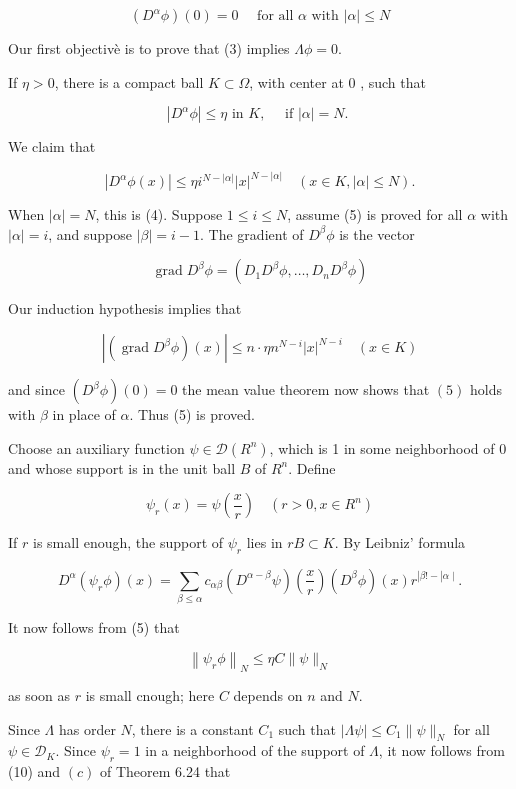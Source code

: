 \documentclass[10pt]{article}
\begin{document}
$$
\left(D^{\alpha} \phi\right)(0)=0 \quad \text { for all } \alpha \text { with }|\alpha| \leq N
$$

Our first objectivè is to prove that (3) implies $\Lambda \phi=0$.

If $\eta>0$, there is a compact ball $K \subset \Omega$, with center at 0 , such that

$$
\left|D^{\alpha} \phi\right| \leq \eta \text { in } K, \quad \text { if }|\alpha|=N \text {. }
$$

We claim that

$$
\left|D^{\alpha} \phi(x)\right| \leq \eta i^{N-|\alpha|}|x|^{N-|\alpha|} \quad(x \in K,|\alpha| \leq N) .
$$

When $|\alpha|=N$, this is (4). Suppose $1 \leq i \leq N$, assume (5) is proved for all $\alpha$ with $|\alpha|=i$, and suppose $|\beta|=i-1$. The gradient of $D^{\beta} \phi$ is the vector

$$
\operatorname{grad} D^{\beta} \phi=\left(D_{1} D^{\beta} \phi, \ldots, D_{n} D^{\beta} \phi\right)
$$

Our induction hypothesis implies that

$$
\left|\left(\operatorname{grad} D^{\beta} \phi\right)(x)\right| \leq n \cdot \eta n^{N-i}|x|^{N-i} \quad(x \in K)
$$

and since $\left(D^{\beta} \phi\right)(0)=0$ the mean value theorem now shows that $(5)$ holds with $\beta$ in place of $\alpha$. Thus (5) is proved.

Choose an auxiliary function $\psi \in \mathscr{D}\left(R^{n}\right)$, which is 1 in some neighborhood of 0 and whose support is in the unit ball $B$ of $R^{n}$. Define

$$
\psi_{r}(x)=\psi\left(\frac{x}{r}\right) \quad\left(r>0, x \in R^{n}\right)
$$

If $r$ is small enough, the support of $\psi_{r}$ lies in $r B \subset K$. By Leibniz' formula

$$
D^{\alpha}\left(\psi_{r} \phi\right)(x)=\sum_{\beta \leq \alpha} c_{\alpha \beta}\left(D^{\alpha-\beta} \psi\right)\left(\frac{x}{r}\right)\left(D^{\beta} \phi\right)(x) r^{|\beta !-| \alpha \mid} .
$$

It now follows from (5) that

$$
\left\|\psi_{r} \phi\right\|_{N} \leq \eta C\|\psi\|_{N}
$$

as soon as $r$ is small cnough; here $C$ depends on $n$ and $N$.

Since $\Lambda$ has order $N$, there is a constant $C_{1}$ such that $|\Lambda \psi| \leq C_{1}\|\psi\|_{N}$ for all $\psi \in \mathscr{D}_{K}$. Since $\psi_{r}=1$ in a neighborhood of the support of $\Lambda$, it now follows from (10) and $(c)$ of Theorem 6.24 that
\end{document}
